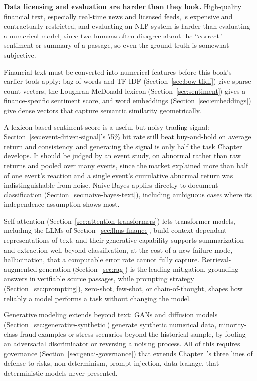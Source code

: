 \documentclass[../ai_in_finance]{subfiles}
\begin{document}
\textbf{Data licensing and evaluation are harder than they look.} High-quality financial text, especially real-time news and licensed feeds, is expensive and contractually restricted, and evaluating an NLP system is harder than evaluating a numerical model, since two humans often disagree about the ``correct'' sentiment or summary of a passage, so even the ground truth is somewhat subjective.


Financial text must be converted into numerical features before this book's earlier tools apply: bag-of-words and TF-IDF (Section~\ref{sec:bow-tfidf}) give sparse count vectors, the Loughran-McDonald lexicon (Section~\ref{sec:sentiment}) gives a finance-specific sentiment score, and word embeddings (Section~\ref{sec:embeddings}) give dense vectors that capture semantic similarity geometrically.

A lexicon-based sentiment score is a useful but noisy trading signal: Section~\ref{sec:event-driven-signal}'s 75\% hit rate still beat buy-and-hold on average return and consistency, and generating the signal is only half the task Chapter~ develops. It should be judged by an event study, on abnormal rather than raw returns and pooled over many events, since the market explained more than half of one event's reaction and a single event's cumulative abnormal return was indistinguishable from noise. Naive Bayes applies directly to document classification (Section~\ref{sec:naive-bayes-text}), including ambiguous cases where its independence assumption shows most.

Self-attention (Section~\ref{sec:attention-transformers}) lets transformer models, including the LLMs of Section~\ref{sec:llms-finance}, build context-dependent representations of text, and their generative capability supports summarization and extraction well beyond classification, at the cost of a new failure mode, hallucination, that a computable error rate cannot fully capture. Retrieval-augmented generation (Section~\ref{sec:rag}) is the leading mitigation, grounding answers in verifiable source passages, while prompting strategy (Section~\ref{sec:prompting}), zero-shot, few-shot, or chain-of-thought, shapes how
reliably a model performs a task without changing the model.

Generative modeling extends beyond text: GANs and
diffusion models (Section~\ref{sec:generative-synthetic}) generate synthetic numerical data, minority-class fraud examples or
stress scenarios beyond the historical sample, by fooling an adversarial discriminator or reversing a noising process.
All of this requires governance (Section~\ref{sec:genai-governance}) that extends Chapter~'s three lines of defense to risks,
non-determinism, prompt injection, data leakage, that deterministic models never presented.
\end{document}
